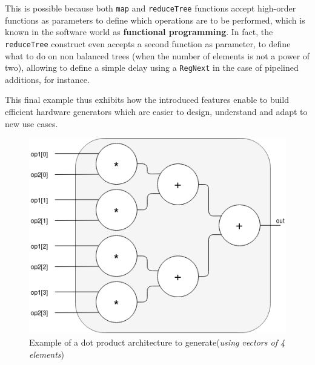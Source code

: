             This is possible because both \lstinline{map} and \lstinline{reduceTree} functions accept high-order functions as parameters to define which operations are to be performed, which is known in the software world as {\bf functional programming}.
            In fact, the \lstinline{reduceTree} construct even accepts a second function as parameter, to define what to do on non balanced trees (when the number of elements is not a power of two), allowing to define a simple delay using a \lstinline{RegNext} in the case of pipelined additions, for instance.

            This final example thus exhibits how the introduced features enable to build efficient hardware generators which are easier to design, understand and adapt to new use cases.

            \begin{figure}[h!]
                \centering
                \includegraphics[width=1.0\textwidth]{Figures/dot-archi}
                \caption[Example of a dot product architecture to generate]{Example of a dot product architecture to generate\newline ({\it using vectors of 4 elements})}
                \label{app.chisel:fig.dot}
            \end{figure}
            

